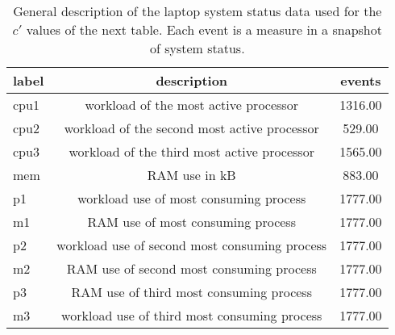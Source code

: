 \begin{table}[!h]
\begin{center}
\begin{tabular}{| l | c | c |}\hline
label & description & events \\\hline
cpu1 & workload of the most active processor  & 1316.00 \\\hline
cpu2 & workload of the second most active processor  & 529.00 \\\hline
cpu3 & workload of the third most active processor  & 1565.00 \\\hline
mem & RAM use in kB  & 883.00 \\\hline
p1 & workload use of most consuming process  & 1777.00 \\\hline
m1 & RAM use of most consuming process  & 1777.00 \\\hline
p2 & workload use of second most consuming process  & 1777.00 \\\hline
m2 & RAM use of second most consuming process  & 1777.00 \\\hline
p3 & RAM use of third most consuming process  & 1777.00 \\\hline
m3 & workload use of third most consuming process  & 1777.00 \\\hline
\end{tabular}
\caption{General description of the laptop system status data used for the $c'$ values of the next table. Each event is a measure in a snapshot of system status.}
\end{center}
\end{table}
